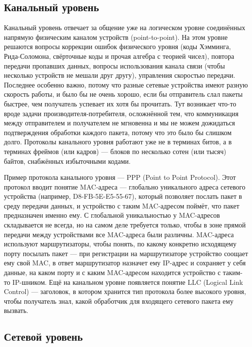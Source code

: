 \documentclass[a5paper]{article}
\begin{document}
\subsection{Канальный уровень}

Канальный уровень отвечает за общение уже на логическом уровне соединённых напрямую физическим каналом устройств (point-to-point). На этом уровне решаются вопросы коррекции ошибок физического уровня (коды Хэмминга, Рида-Соломона, свёрточные коды и прочая алгебра с теорией чисел), повтора передачи пропавших данных, вопросы использования канала связи (чтобы несколько устройств не мешали друг другу), управления скоростью передачи. Последнее особенно важно, потому что разные сетевые устройства имеют разную скорость работы, и было бы не очень хорошо, если бы отправитель слал пакеты быстрее, чем получатель успевает их хотя бы прочитать. Тут возникает что-то вроде задачи производителя-потребителя, осложнённой тем, что коммуникация между отправителем и получателем не мгновенна и мы не можем дожидаться подтверждения обработки каждого пакета, потому что это было бы слишком долго. Протоколы канального уровня работают уже не в терминах битов, а в терминах фреймов (или кадров) --- блоков по несколько сотен (или тысяч) байтов, снабжённых избыточными кодами.

Пример протокола канального уровня --- PPP (Point to Point Protocol). Этот протокол вводит понятие MAC-адреса --- глобально уникального адреса сетевого устройства (например, D8-FB-5E-E5-55-67), который позволяет послать пакет в среду передачи данных, и устройство с таким MAC-адресом поймёт, что пакет предназначен именно ему. С глобальной уникальностью у MAC-адресов складывается не всегда, но на самом деле требуется только, чтобы в зоне прямой передачи между устройствами все MAC-адреса были различны. MAC-адреса используют маршрутизаторы, чтобы понять, по какому конкретно исходящему порту посылать пакет --- при регистрации на маршрутизаторе устройство соощает ему свой MAC, в ответ маршрутизатор назначет ему IP-адрес и сохраняет у себя данные, на каком порту и с каким MAC-адресом находится устройство с таким-то IP-шником. Ещё на канальном уровне появляется понятие LLC (Logical Link Control) --- заголовок, в котором хранится тип протокола более высокого уровня, чтобы получатель знал, какой обработчик для входящего сетевого пакета ему вызвать.

\subsection{Сетевой уровень}
\end{document}

